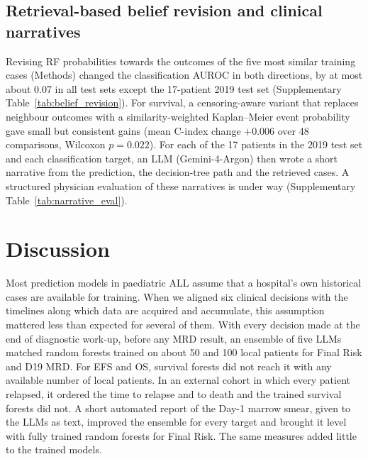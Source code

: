\documentclass[pdflatex,sn-nature]{sn-jnl}
\begin{document}
\subsection{Retrieval-based belief revision and clinical narratives}
\label{sec:rag}

Revising RF probabilities towards the outcomes of the five most similar
training cases (Methods) changed the classification AUROC in both
directions, by at most about 0.07 in all test sets except the
17-patient 2019 test set (Supplementary Table~\ref{tab:belief_revision}).
For survival, a censoring-aware variant that replaces neighbour
outcomes with a similarity-weighted Kaplan--Meier event probability
gave small but consistent gains (mean C-index change $+0.006$ over 48
comparisons, Wilcoxon $p=0.022$).
For each of the 17 patients in the 2019 test set and each
classification target, an LLM (Gemini-4-Argon) then wrote a short
narrative from the prediction, the decision-tree path and the
retrieved cases.
A structured physician evaluation of these narratives is under way
(Supplementary Table~\ref{tab:narrative_eval}).

\section{Discussion}\label{sec:discussion}

Most prediction models in paediatric ALL assume that a hospital's own
historical cases are available for training.
When we aligned six clinical decisions with the timelines along which
data are acquired and accumulate, this assumption mattered less than
expected for several of them.
With every decision made at the end of diagnostic work-up, before any
MRD result, an ensemble of five LLMs matched random forests trained on
about 50 and 100 local patients for Final Risk and D19 MRD.
For EFS and OS, survival forests did not reach it with any available
number of local patients.
In an external cohort in which every patient relapsed, it ordered the
time to relapse and to death and the trained survival forests did not.
A short automated report of the Day-1 marrow smear, given to the LLMs
as text, improved the ensemble for every target and brought it level
with fully trained random forests for Final Risk.
The same measures added little to the trained models.
\end{document}
